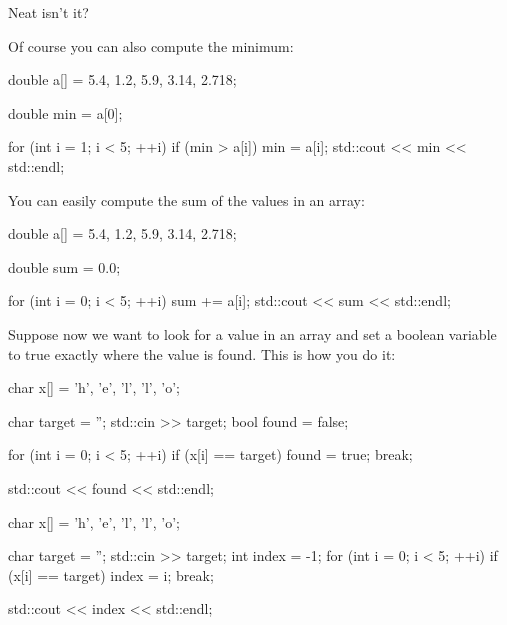 Neat isn't it?

Of course you can also compute the minimum:

\begin{consolethree}[escapeinside=||]
double a[] = {5.4, 1.2, 5.9, 3.14, 2.718};

double min = a[0];

for (int i = 1; i < 5; ++i)
{
    if (min > a[i]) min = a[i];
    {
        std::cout << min << std::endl;
    }
} 
\end{consolethree}

\newpage{}

You can easily compute the sum of the values in an array:

\begin{consolethree}[escapeinside=||]
double a[] = {5.4, 1.2, 5.9, 3.14, 2.718};

double sum = 0.0;

for (int i = 0; i < 5; ++i)
{
    sum += a[i];
    std::cout << sum << std::endl;
} 
\end{consolethree}




\newpage{}

Suppose now we want to look for a value in an array and set a boolean
variable to true exactly where the value is found. This is how you do
it:

\begin{consolethree}[escapeinside=||]
char x[] = {'h', 'e', 'l', 'l', 'o'};

char target = '';
std::cin >> target;
bool found = false;

for (int i = 0; i < 5; ++i)
{
    if (x[i] == target)
    {
        found = true;
        break;
    }
}

std::cout << found << std::endl; 
\end{consolethree}


\begin{consolethree}[escapeinside=||]
char x[] = {'h', 'e', 'l', 'l', 'o'};

char target = '';
std::cin >> target;
int index = -1;
for (int i = 0; i < 5; ++i)
{
    if (x[i] == target)
    {
        index = i;
        break;
    }
}

std::cout << index << std::endl; 
\end{consolethree}

